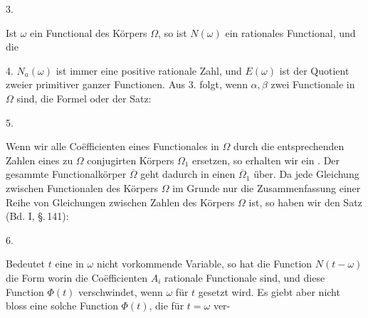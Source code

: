
3. 

Ist $\omega$ ein Functional des Körpers $\Omega$, so ist $N(\omega)$ ein rationales
Functional, und die 

4. 
$N_a(\omega)$ ist immer eine positive rationale Zahl, und $E(\omega)$
ist der Quotient zweier primitiver ganzer Functionen. Aus 3.
folgt, wenn $\alpha, \beta$ zwei Functionale in $\Omega$ sind, die Formel
oder der Satz:

5. 

Wenn wir alle Co\"efficienten eines Functionales in $\Omega$ durch
die entsprechenden Zahlen eines zu $\Omega$ conjugirten Körpers $\Omega_1$
ersetzen, so erhalten wir ein . Der
gesammte Functionalkörper $\overline{\Omega}$ geht dadurch in einen
 $\overline{\Omega}_1$ über. Da jede Gleichung
zwischen Functionalen des Körpers $\Omega$ im Grunde nur die
Zusammenfassung einer Reihe von Gleichungen zwischen Zahlen des
Körpers $\Omega$ ist, so haben wir den Satz (Bd. I, \S.\,141):

6. 

Bedeutet $t$ eine in $\omega$ nicht vorkommende Variable, so hat
die Function $N(t-\omega)$ die Form
worin die Co\"efficienten $A_i$ rationale Functionale sind, und diese
Function $\Phi(t)$ verschwindet, wenn $\omega$ für $t$ gesetzt wird. Es giebt
aber nicht bloss eine solche Function $\Phi(t)$, die für $t = \omega$ ver-
